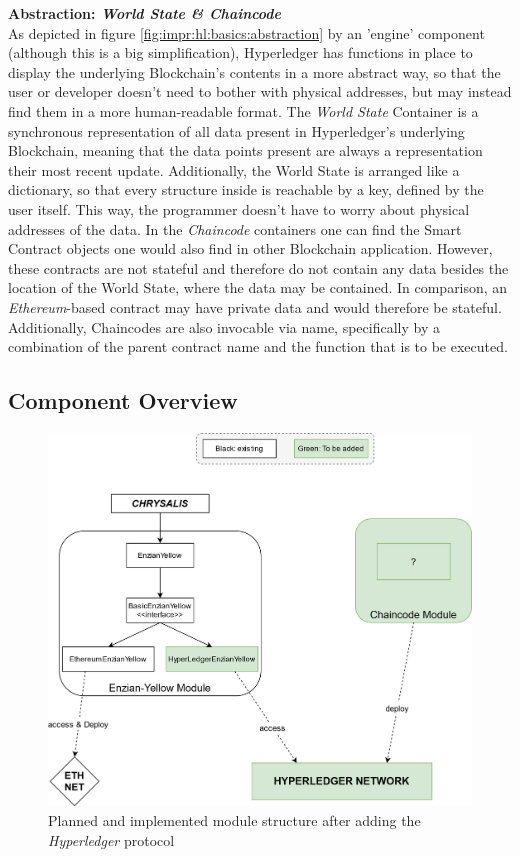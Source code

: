 \textbf{Abstraction: \emph{World State \& Chaincode}} \\[0.2em]
As depicted in figure \ref{fig:impr:hl:basics:abstraction} by an 'engine' component (although this is a big simplification), Hyperledger has functions in place to display the underlying Blockchain's contents in a more abstract way, so that the user or developer doesn't need to bother with physical addresses, but may instead find them in a more human-readable format. \newline
The \emph{World State} Container is a synchronous representation of all data present in Hyperledger's underlying Blockchain, meaning that the data points present are always a representation their most recent update. Additionally, the World State is arranged like a dictionary, so that every structure inside is reachable by a key, defined by the user itself. This way, the programmer doesn't have to worry about physical addresses of the data. \newline
In the \emph{Chaincode} containers one can find the Smart Contract objects one would also find in other Blockchain application. However, these contracts are not stateful and therefore do not contain any data besides the location of the World State, where the data may be contained. In comparison, an \emph{Ethereum}-based contract may have private data and would therefore be stateful. Additionally, Chaincodes are also invocable via name, specifically by a combination of the parent contract name and the function that is to be executed.

\subsection{Component Overview}
\label{sec:impr:hl:requirements}

\begin{figure}[h]
	\centering
	\captionsetup{justification=centering,margin=2cm}
	\includegraphics[width=\textwidth]{gfx/hl-structure}
	\caption{Planned and implemented module structure after adding the \emph{Hyperledger} protocol}
	\label{fig:impr:hl:structure}
\end{figure}

